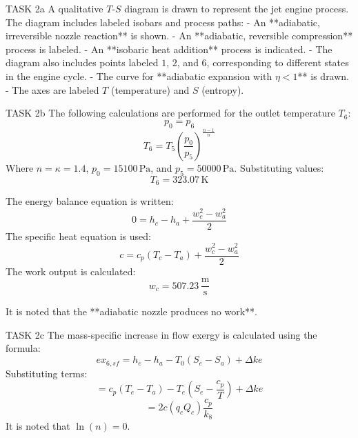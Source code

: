 TASK 2a  
A qualitative \( T \)-\( S \) diagram is drawn to represent the jet engine process. The diagram includes labeled isobars and process paths:  
- An **adiabatic, irreversible nozzle reaction** is shown.  
- An **adiabatic, reversible compression** process is labeled.  
- An **isobaric heat addition** process is indicated.  
- The diagram also includes points labeled \( 1 \), \( 2 \), and \( 6 \), corresponding to different states in the engine cycle.  
- The curve for **adiabatic expansion with \( \eta < 1 \)** is drawn.  
- The axes are labeled \( T \) (temperature) and \( S \) (entropy).  

TASK 2b  
The following calculations are performed for the outlet temperature \( T_6 \):  
\[
p_0 = p_6
\]
\[
T_6 = T_5 \left( \frac{p_0}{p_5} \right)^{\frac{n-1}{n}}
\]
Where \( n = \kappa = 1.4 \), \( p_0 = 15100 \, \text{Pa} \), and \( p_5 = 50000 \, \text{Pa} \). Substituting values:  
\[
T_6 = 323.07 \, \text{K}
\]

The energy balance equation is written:  
\[
0 = h_c - h_a + \frac{w_c^2 - w_a^2}{2}
\]
The specific heat equation is used:  
\[
c = c_p (T_c - T_a) + \frac{w_c^2 - w_a^2}{2}
\]
The work output is calculated:  
\[
w_c = 507.23 \, \frac{\text{m}}{\text{s}}
\]

It is noted that the **adiabatic nozzle produces no work**.  

TASK 2c  
The mass-specific increase in flow exergy is calculated using the formula:  
\[
ex_{6,sf} = h_e - h_a - T_0(S_e - S_a) + \Delta ke
\]
Substituting terms:  
\[
= c_p (T_e - T_a) - T_e \left( S_e - \frac{c_p}{T} \right) + \Delta ke
\]
\[
= 2c (q_c Q_c) \frac{c_p}{k_8}
\]
It is noted that \( \ln(n) = 0 \).